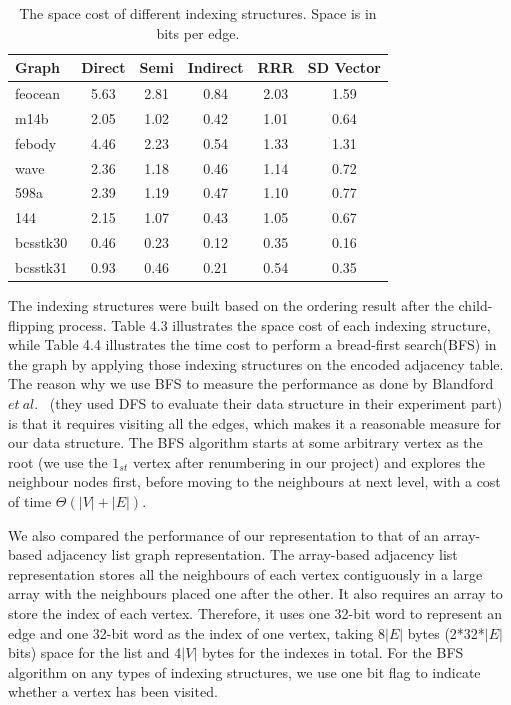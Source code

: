 \documentclass[12pt,glossary]{dalthesis}
\begin{document}
\begin{table}[ht]
\centering
\caption{The space cost of different indexing structures. Space is in bits per edge.}
\label{my-label}
\begin{tabular}{|l||c||c||c||c||c|}
\hline
Graph    & Direct & Semi & Indirect & RRR & SD Vector \\ \hline
feocean  &    5.63    &   2.81   &     0.84     &  2.03   &   1.59        \\
m14b     &    2.05    &   1.02   &    0.42      &  1.01   &   0.64        \\
febody   &    4.46   &   2.23   &     0.54     &  1.33   &    1.31        \\
wave     &   2.36    &   1.18   &    0.46      &   1.14   &   0.72         \\
598a     &    2.39    &   1.19   &   0.47       &  1.10   &    0.77       \\
144      &    2.15   &   1.07   &    0.43      &  1.05    &   0.67          \\
bcsstk30 &   0.46   &   0.23   &      0.12    &   0.35   &   0.16        \\
bcsstk31 &   0.93   &   0.46   &     0.21     &  0.54   &   0.35        \\ \hline
\end{tabular}
\end{table}
\bigskip

The indexing structures were built based on the ordering result after the child-flipping process. Table 4.3 illustrates the space cost of each indexing structure, while Table 4.4 illustrates the time cost to perform a bread-first search(BFS) in the graph by applying those indexing structures on the encoded adjacency table. The reason why we use BFS to measure the performance as done by Blandford $et \ al.$~\cite{compact-representation} (they used DFS to evaluate their data structure in their experiment part) is that it requires visiting all the edges, which makes it a reasonable measure for our data structure. The BFS algorithm starts at some arbitrary vertex as the root (we use the $1_{st}$ vertex after renumbering in our project) and explores the neighbour nodes first, before moving to the neighbours at next level, with a cost of time $\Theta(|V| + |E|)$. 

\bigskip

We also compared the performance of our representation to that of an array-based adjacency list graph representation. The array-based adjacency list representation stores all the neighbours of each vertex contiguously in a large array with the neighbours placed one after the other. It also requires an array to store the index of each vertex. Therefore, it uses one 32-bit word to represent an edge and one 32-bit word as the index of one vertex, taking 8$|E|$ bytes (2*32*$|E|$ bits) space for the list and 4$|V|$ bytes for the indexes in total. For the BFS algorithm on any types of indexing structures, we use one bit flag to indicate whether a vertex has been visited.
\bigskip     
\end{document}
